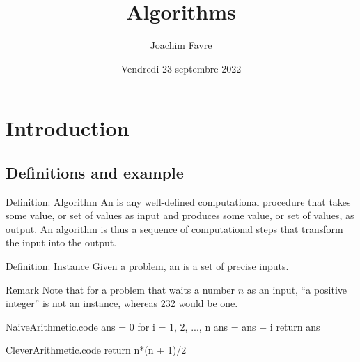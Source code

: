 \documentclass[a4paper]{article}
\title{Algorithms}
\author{Joachim Favre}
\date{Vendredi 23 septembre 2022}
\begin{document}
\maketitle


\section{Introduction}
\subsection{Definitions and example}
\begin{parag}{Definition: Algorithm}
    An  is any well-defined computational procedure that takes some value, or set of values as input and produces some value, or set of values, as output. An algorithm is thus a sequence of computational steps that transform the input into the output.
\end{parag}

\begin{parag}{Definition: Instance}
    Given a problem, an  is a set of precise inputs. 
    
    \begin{subparag}{Remark}
        Note that for a problem that waits a number $n$ as an input, ``a positive integer'' is not an instance, whereas 232 would be one.
    \end{subparag}
    
\end{parag}


\begin{filecontents*}[overwrite]{NaiveArithmetic.code}
ans = 0
for i = 1, 2, ..., n
    ans = ans + i
return ans
\end{filecontents*}

\begin{filecontents*}[overwrite]{CleverArithmetic.code}
return n*(n + 1)/2
\end{filecontents*}
\end{document}
